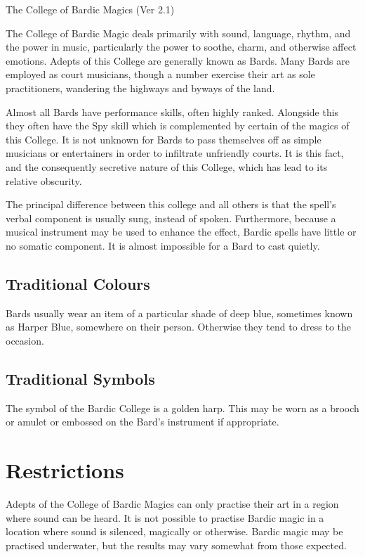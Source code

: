 \begin{Chapter}{The College of Bardic Magics (Ver 2.1)}

The College of Bardic Magic deals primarily with sound, language,
rhythm, and the power in music, particularly the power to soothe,
charm, and otherwise affect emotions.  Adepts of this College are
generally known as Bards.  Many Bards are employed as court musicians,
though a number exercise their art as sole practitioners, wandering
the highways and byways of the land.

Almost all Bards have performance skills, often highly ranked.
Alongside this they often have the Spy skill which is complemented by
certain of the magics of this College. It is not unknown for Bards to
pass themselves off as simple musicians or entertainers in order to
infiltrate unfriendly courts.  It is this fact, and the consequently
secretive nature of this College, which has lead to its relative
obscurity.

The principal difference between this college and all others is that
the spell’s verbal component is usually sung, instead of spoken.
Furthermore, because a musical instrument may be used to enhance the
effect, Bardic spells have little or no somatic component.  It is
almost impossible for a Bard to cast quietly.

\subsection{Traditional Colours}

Bards usually wear an item of a particular shade of deep blue,
sometimes known as Harper Blue, somewhere on their person. Otherwise
they tend to dress to the occasion.

\subsection{Traditional Symbols}

The symbol of the Bardic College is a golden harp.  This may be worn
as a brooch or amulet or embossed on the Bard’s instrument if
appropriate.

\section{Restrictions}

Adepts of the College of Bardic Magics can only practise their art in
a region where sound can be heard. It is not possible to practise
Bardic magic in a location where sound is silenced, magically or
otherwise.  Bardic magic may be practised underwater, but the results
may vary somewhat from those expected.


\end{Chapter}
